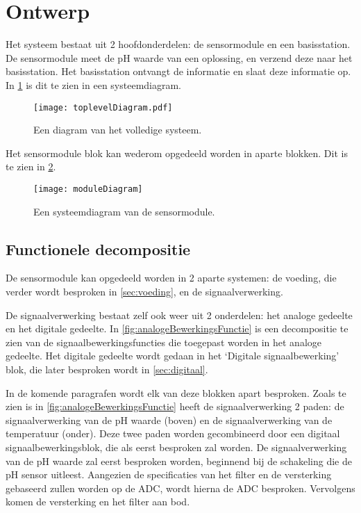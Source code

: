 \section{Ontwerp}\label{sec:ontwerp}
Het systeem bestaat uit 2 hoofdonderdelen: de sensormodule en een basisstation. De sensormodule meet de pH waarde van een oplossing, en verzend deze naar het basisstation. Het basisstation ontvangt de informatie en slaat deze informatie op.
In \cref{fig:functional} is dit te zien in een systeemdiagram.

\begin{figure}[!htbp]
    \centering
    \texttt{[image: toplevelDiagram.pdf]}
    \caption[short]{Een diagram van het volledige systeem.}
    \label{fig:functional}
\end{figure}

Het sensormodule blok kan wederom opgedeeld worden in aparte blokken. Dit is te zien in \cref{fig:moduleDiagram}.

\begin{figure}[!htbp]
    \centering
    \texttt{[image: moduleDiagram]}
    \caption{Een systeemdiagram van de sensormodule.}
    \label{fig:moduleDiagram}
\end{figure}

\subsection{Functionele decompositie}
De sensormodule kan opgedeeld worden in 2 aparte systemen: de voeding, die verder wordt besproken in \cref{sec:voeding}, en de signaalverwerking.

De signaalverwerking bestaat zelf ook weer uit 2 onderdelen: het analoge gedeelte en het digitale gedeelte. In \cref{fig:analogeBewerkingsFunctie} is een decompositie te zien van de signaalbewerkingsfuncties die toegepast worden in het analoge gedeelte. Het digitale gedeelte wordt gedaan in het `Digitale signaalbewerking' blok, die later besproken wordt in \cref{sec:digitaal}.

In de komende paragrafen wordt elk van deze blokken apart besproken. Zoals te zien is in \cref{fig:analogeBewerkingsFunctie} heeft de signaalverwerking 2 paden: de signaalverwerking van de pH waarde (boven) en de signaalverwerking van de temperatuur (onder). Deze twee paden worden gecombineerd door een digitaal signaalbewerkingsblok, die als eerst besproken zal worden. De signaalverwerking van de pH waarde zal eerst besproken worden, beginnend bij de schakeling die de pH sensor uitleest. Aangezien de specificaties van het filter en de versterking gebaseerd zullen worden op de ADC, wordt hierna de ADC besproken. Vervolgens komen de versterking en het filter aan bod.

